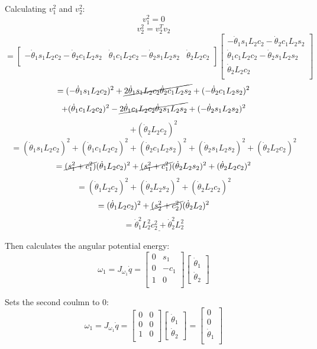 \documentclass[12pt,norsk,a4paper]{article}
\begin{document}
    Calculating $v_1^2$ and $v_2^2$:
    \[v_1^2 = 0\]
    \[v_2^2 = v_2^Tv_2\]
    \[=\left[\begin{array}{ccc}
        -\dot\theta_1s_1L_2c_2-\dot\theta_2c_1L_2s_2&
        \dot\theta_1c_1L_2c_2-\dot\theta_2s_1L_2s_2&
        \dot\theta_2L_2c_2\\
    \end{array}\right]
    \left[\begin{array}{c}
        -\dot\theta_1s_1L_2c_2-\dot\theta_2c_1L_2s_2\\
        \dot\theta_1c_1L_2c_2-\dot\theta_2s_1L_2s_2\\
        \dot\theta_2L_2c_2\\
    \end{array}\right]\]
    \[= (-\dot\theta_1s_1L_2c_2)^2+ \cancel{2\dot\theta_1s_1L_2c_2\dot\theta_2c_1L_2s_2} + (-\dot\theta_2c_1L_2s_2)^2\]
    \[+ (\dot\theta_1c_1L_2c_2)^2 - \cancel{2\dot\theta_1c_1L_2c_2\dot\theta_2s_1L_2s_2} + (-\dot\theta_2s_1L_2s_2)^2\]
    \[+ (\dot\theta_2L_2c_2)^2\]
    \vspace{3mm}
    \[= (\dot\theta_1s_1L_2c_2)^2 + (\dot\theta_1c_1L_2c_2)^2 + (\dot\theta_2c_1L_2s_2)^2 + (\dot\theta_2s_1L_2s_2)^2 + (\dot\theta_2L_2c_2)^2\]
    \[= \cancel{(s_1^2+c_1^2)}(\dot\theta_1L_2c_2)^2 + \cancel{(s_1^2+c_1^2)}(\dot\theta_2L_2s_2)^2 + (\dot\theta_2L_2c_2)^2\]
    \[= (\dot\theta_1L_2c_2)^2 + (\dot\theta_2L_2s_2)^2 + (\dot\theta_2L_2c_2)^2\]
    \[= (\dot\theta_1L_2c_2)^2 + \cancel{(s_2^2+c_2^2)}(\dot\theta_2L_2)^2\]
    \[= \underline{\dot\theta_1^2L_2^2c_2^2 + \dot\theta_2^2L_2^2}\]


    Then calculates the angular potential energy:\\

    \[\omega_1 = J_{\omega_1}\dot q = 
    \left[\begin{array}{cc}
        0 & s_1\\
        0 & -c_1\\
        1 & 0\\
    \end{array}\right]
    \left[\begin{array}{c}
        \dot\theta_1 \\ \dot\theta_2
    \end{array}\right]\]
    
    Sets the second coulmn to 0:\\
    \[\omega_1 = J_{\omega_1}\dot q = 
    \left[\begin{array}{cc}
        0 & 0\\
        0 & 0\\
        1 & 0\\
    \end{array}\right]
    \left[\begin{array}{c}
        \dot\theta_1 \\ \dot\theta_2
    \end{array}\right]
    = \left[\begin{array}{c}
        0\\
        0\\
        \dot\theta_1\\
    \end{array}\right]\]
\end{document}

